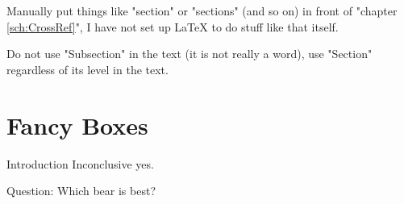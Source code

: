 Manually put things like "section" or "sections" (and so on) in front of "chapter \ref{sch:CrossRef}", I have not set up LaTeX to do stuff like that itself.

Do not use "Subsection" in the text (it is not really a word), use "Section" regardless of its level in the text.




\chapter{Fancy Boxes}

\begin{FancyBox}{Introduction}
    Inconclusive yes.
\end{FancyBox}

\begin{SideBar}{Question:}
    Which bear is best? \lipsum[1]
\end{SideBar}


